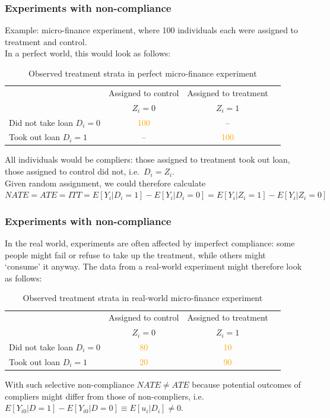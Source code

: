 \documentclass[12pt,english,dvipsnames,aspectratio=169,handout]{beamer}\usepackage[]{graphicx}\usepackage[]{xcolor}
\begin{document}
\begin{frame}
\frametitle{Experiments with non-compliance}
\footnotesize
Example: micro-finance experiment, where 100 individuals each were assigned to treatment and control. \\
In a perfect world, this would look as follows:

\begin{table}\footnotesize
\begin{tabular}{lccc}
\hline
                                 & Assigned to control     & Assigned to treatment \\
                                 & $Z_i=0$                 & $Z_i=1$ \\ 
      \hline
     Did not take loan $D_i=0$   & \textcolor{orange}{100} & --                      \\
     Took out loan $D_i=1$       & --                      & \textcolor{orange}{100} \\
\hline
\end{tabular}
\caption{\scriptsize Observed treatment strata in perfect micro-finance experiment}
\end{table}

\vspace{-2mm}
\footnotesize All individuals would be compliers: those assigned to treatment took out loan, those assigned to control did not, i.e.\ $D_i=Z_i$. \\
Given random assignment, we could therefore calculate $NATE=ATE=ITT=E[Y_{i}|D_i=1] - E[Y_{i}|D_i=0]=E[Y_{i}|Z_i=1] - E[Y_{i}|Z_i=0]$
\end{frame}


\begin{frame}
\frametitle{Experiments with non-compliance}
\footnotesize
In the real world, experiments are often affected by imperfect compliance: some people might fail or refuse to take up the treatment, while others might `consume' it anyway. The data from a real-world experiment might therefore look as follows: \\
\begin{table}\centering\footnotesize
\begin{tabular}{lccc}
\hline
                                 & Assigned to control     & Assigned to treatment \\
                                 & $Z_i=0$                 & $Z_i=1$ \\ 
      \hline
     Did not take loan $D_i=0$   & \textcolor{orange}{80} & \textcolor{orange}{10} \\
     Took out loan $D_i=1$       & \textcolor{orange}{20}& \textcolor{orange}{90} \\
\hline
\end{tabular}
\caption{\scriptsize Observed treatment strata in real-world micro-finance experiment}
\end{table}

\vspace{-3mm}
\footnotesize With such selective non-compliance $NATE \neq ATE$ because potential outcomes of compliers might differ from those of non-compliers, i.e.\  $E[Y_{i0}|D = 1] - E[Y_{i0}|D = 0] \equiv E[u_i|D_i] \neq 0$.
\end{frame}
\end{document}
